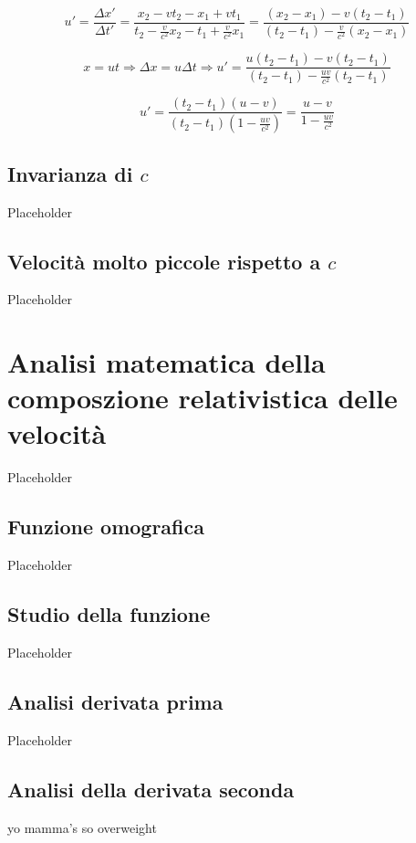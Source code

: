 \documentclass{article}
\begin{document}
\begin{equation}
    u' = \frac{\Delta x'}{\Delta t'} = \frac{x_2 - vt_2 - x_1 + vt_1}{t_2 - \frac{v}{c^2} x_2 - t_1 + \frac{v}{c^2} x_1} = \frac{(x_2 - x_1) - v(t_2 - t_1)}{(t_2 - t_1) - \frac{v}{c^2}(x_2 - x_1)}
\end{equation}

\begin{equation}
    x = ut \Rightarrow \Delta x = u \Delta t \Rightarrow u' = \frac{u(t_2 - t_1) - v(t_2 - t_1)}{(t_2 - t_1)-\frac{uv}{c^2}(t_2 - t_1)}
\end{equation}

\begin{equation}
    u' = \frac{(t_2 - t_1)(u - v)}{(t_2 - t_1)\left(1 - \frac{uv}{c^2}\right)} = \frac{u - v}{1 - \frac{uv}{c^2}}
\end{equation}


\subsection{Invarianza di \(c\)}
Placeholder

\subsection{Velocità molto piccole rispetto a \(c\)}
Placeholder

\section{Analisi matematica della composzione relativistica delle velocità}
Placeholder


\subsection{Funzione omografica}
Placeholder

\subsection{Studio della funzione}
Placeholder

\subsection{Analisi derivata prima}
Placeholder

\subsection{Analisi della derivata seconda}
yo mamma's so overweight
\end{document}
